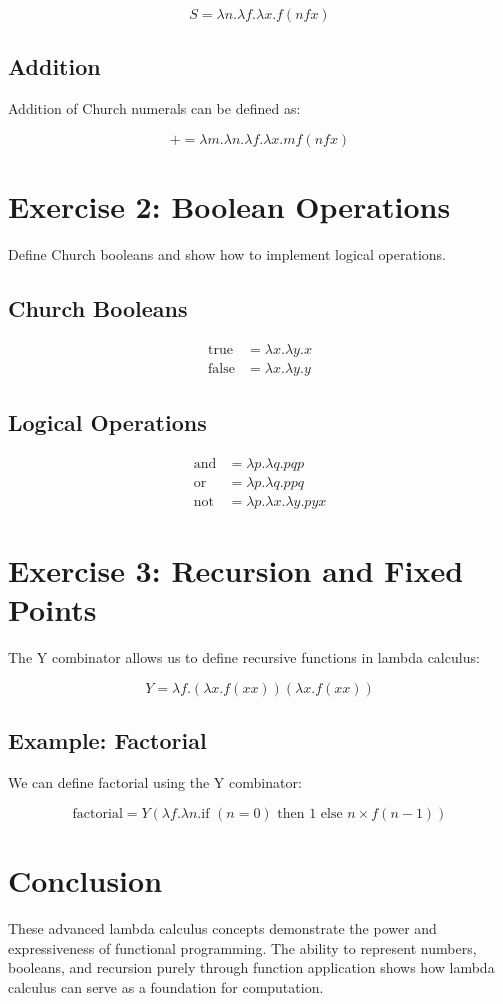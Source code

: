 \documentclass{article}
\theoremstyle{plain}
\theoremstyle{definition}
\theoremstyle{remark}
\begin{document}
$$S = \lambda n.\lambda f.\lambda x.f(n f x)$$

\subsection{Addition}

Addition of Church numerals can be defined as:

$$+ = \lambda m.\lambda n.\lambda f.\lambda x.m f (n f x)$$

\section{Exercise 2: Boolean Operations}

Define Church booleans and show how to implement logical operations.

\subsection{Church Booleans}

\begin{align}
\text{true} &= \lambda x.\lambda y.x \\
\text{false} &= \lambda x.\lambda y.y
\end{align}

\subsection{Logical Operations}

\begin{align}
\text{and} &= \lambda p.\lambda q.p q p \\
\text{or} &= \lambda p.\lambda q.p p q \\
\text{not} &= \lambda p.\lambda x.\lambda y.p y x
\end{align}

\section{Exercise 3: Recursion and Fixed Points}

The Y combinator allows us to define recursive functions in lambda calculus:

$$Y = \lambda f.(\lambda x.f(x x))(\lambda x.f(x x))$$

\subsection{Example: Factorial}

We can define factorial using the Y combinator:

$$\text{factorial} = Y(\lambda f.\lambda n.\text{if } (n = 0) \text{ then } 1 \text{ else } n \times f(n-1))$$

\section{Conclusion}

These advanced lambda calculus concepts demonstrate the power and expressiveness of functional programming. The ability to represent numbers, booleans, and recursion purely through function application shows how lambda calculus can serve as a foundation for computation.
\end{document}
